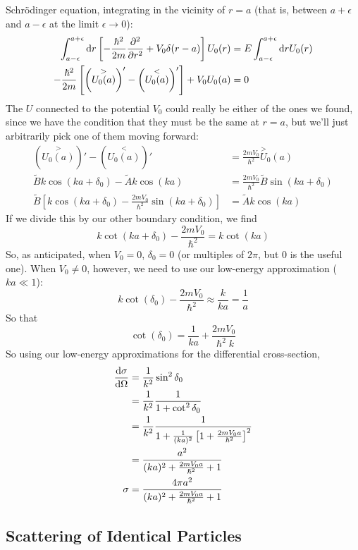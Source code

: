 \documentclass[a4paper]{article}
\begin{document}
Schr\"odinger equation, integrating in the vicinity of $r=a$ (that is, between
$a+\epsilon$ and $a-\epsilon$ at the limit $\epsilon\to0$):
\begin{align*}
	\int_{a-\epsilon}^{a+\epsilon}\d r\left[-\frac{\hslash^2}{2m} \pd[2]{r}
	+V_0\delta(r-a)\right]U_0(r) &= E\int_{a-\epsilon}^{a+\epsilon}\d r
	U_0(r)\\
	-\frac{\hslash^2}{2m}\left[\left(\overset{>}{U_0(a)}\right)'
	-\left(\overset{<}{U_0(a)}\right)'\right] + V_0U_0(a) &= 0\\
\end{align*}
The $U$ connected to the potential $V_0$ could really be either of the ones we
found, since we have the condition that they must be the same at $r=a$, but
we'll just arbitrarily pick one of them moving forward:
\begin{align*}
	\left(\overset{>}{U_0(a)}\right)'-\left(\overset{<}{U_0(a)}\right)'&=
	\frac{2mV_0}{\hslash^2}\overset{>}U_0(a)\\
	\tilde{B}k\cos(ka+\delta_0)-\tilde{A}k\cos(ka) &=
	\frac{2mV_0}{\hslash^2}\tilde{B}\sin(ka+\delta_0)\\
	\tilde{B}\left[k\cos(ka+\delta_0)-\frac{2mV_0}{\hslash^2}
	\sin(ka+\delta_0)\right] &= \tilde{A}k\cos(ka)
\end{align*}
If we divide this by our other boundary condition, we find
\[
	k\cot(ka+\delta_0) - \frac{2mV_0}{\hslash^2} = k\cot(ka)
\]
So, as anticipated, when $V_0=0$, $\delta_0=0$ (or multiples of $2\pi$, but 0
is the useful one). When $V_0\neq 0$, however, we need to use our low-energy
approximation ($ka\ll1$):
\[
	k\cot(\delta_0)-\frac{2mV_0}{\hslash^2} \approx \frac{k}{ka} =
	\frac{1}{a}
\]
So that
\[
	\cot(\delta_0) = \frac{1}{ka} + \frac{2mV_0}{\hslash^2k}
\]
So using our low-energy approximations for the differential cross-section,
\begin{align*}
	\frac{\mathrm{d} \sigma}{\mathrm{d} \Omega} &= \frac{1}{k^2}\sin^2\delta_0\\
	&= \frac{1}{k^2}\frac{1}{1+\cot^2\delta_0}\\
	&= \frac{1}{k^2} \frac{1}{1+\frac{1}{(ka)^2}
	\left[1 + \frac{2mV_0a}{\hslash^2}\right]^2}\\
	&= \frac{a^2}{(ka)^2+\frac{2mV_0a}{\hslash^2}+1}\\
	\sigma &= \frac{4\pi a^2}{(ka)^2+\frac{2mV_0a}{\hslash^2}+1}
\end{align*}

\subsection{Scattering of Identical Particles}
\end{document}
